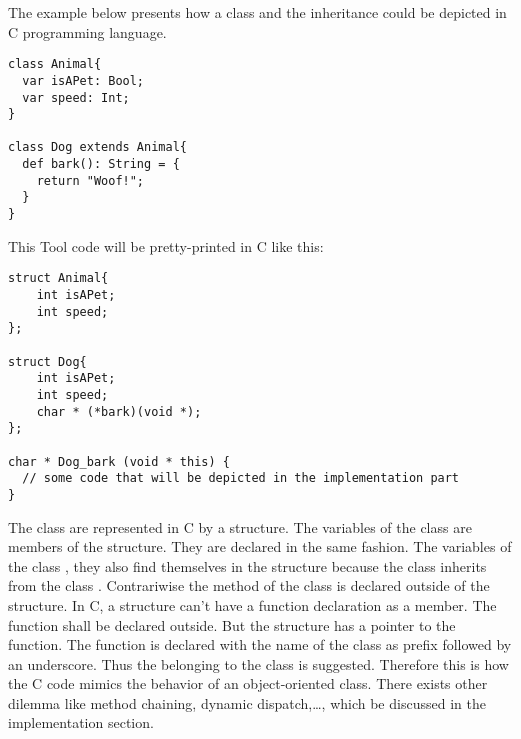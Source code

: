 The example below presents how a class and the inheritance could be depicted in C programming language.
\lstset{style=customtool}
\begin{lstlisting}
class Animal{
  var isAPet: Bool;
  var speed: Int;
}

class Dog extends Animal{
  def bark(): String = {
    return "Woof!";
  }
}
\end{lstlisting}
This Tool code will be pretty-printed in C like this:
\lstset{style=customc}
\begin{lstlisting}
struct Animal{
	int isAPet;
	int speed;
};

struct Dog{
	int isAPet;
	int speed;
	char * (*bark)(void *);
};

char * Dog_bark (void * this) {
  // some code that will be depicted in the implementation part
}
\end{lstlisting}
The class are represented in C by a structure. The variables of the class
are members of the structure. They are declared in the same fashion.
\newline
The variables of the class , they also find themselves in the  structure
because the class  inherits from the class .
\newline
Contrariwise the method of the class is declared outside of the structure.
In C, a structure can't have a function declaration as a member. The function shall
be declared outside. But the structure has a pointer to the function.
\newline
The function is declared with the name of the class as prefix followed by an underscore.
Thus the belonging to the  class is suggested.
\newline
Therefore this is how the C code mimics the behavior of an object-oriented class.
\newline
There exists other dilemma like method chaining, dynamic dispatch,\ldots, which be discussed
in the implementation section.
\newline
